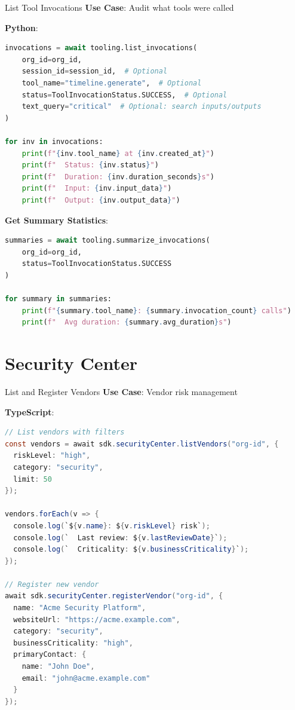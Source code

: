 \documentclass[aspectratio=169]{beamer}
\begin{document}
\begin{frame}[fragile]{List Tool Invocations}
\textbf{Use Case}: Audit what tools were called

\textbf{Python}:
\begin{lstlisting}[language=Python]
invocations = await tooling.list_invocations(
    org_id=org_id,
    session_id=session_id,  # Optional
    tool_name="timeline.generate",  # Optional
    status=ToolInvocationStatus.SUCCESS,  # Optional
    text_query="critical"  # Optional: search inputs/outputs
)

for inv in invocations:
    print(f"{inv.tool_name} at {inv.created_at}")
    print(f"  Status: {inv.status}")
    print(f"  Duration: {inv.duration_seconds}s")
    print(f"  Input: {inv.input_data}")
    print(f"  Output: {inv.output_data}")
\end{lstlisting}

\textbf{Get Summary Statistics}:
\begin{lstlisting}[language=Python]
summaries = await tooling.summarize_invocations(
    org_id=org_id,
    status=ToolInvocationStatus.SUCCESS
)

for summary in summaries:
    print(f"{summary.tool_name}: {summary.invocation_count} calls")
    print(f"  Avg duration: {summary.avg_duration}s")
\end{lstlisting}
\end{frame}

\section{Security Center}

\begin{frame}[fragile]{List and Register Vendors}
\textbf{Use Case}: Vendor risk management

\textbf{TypeScript}:
\begin{lstlisting}[language=Java]
// List vendors with filters
const vendors = await sdk.securityCenter.listVendors("org-id", {
  riskLevel: "high",
  category: "security",
  limit: 50
});

vendors.forEach(v => {
  console.log(`${v.name}: ${v.riskLevel} risk`);
  console.log(`  Last review: ${v.lastReviewDate}`);
  console.log(`  Criticality: ${v.businessCriticality}`);
});

// Register new vendor
await sdk.securityCenter.registerVendor("org-id", {
  name: "Acme Security Platform",
  websiteUrl: "https://acme.example.com",
  category: "security",
  businessCriticality: "high",
  primaryContact: {
    name: "John Doe",
    email: "john@acme.example.com"
  }
});
\end{lstlisting}
\end{frame}
\end{document}
